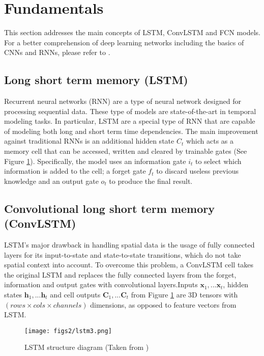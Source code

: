

\section{Fundamentals}

This section addresses the main concepts of LSTM, ConvLSTM and FCN models. For a better comprehension of deep learning networks including the basics of CNNs and RNNs, please refer to \cite{Goodfellow-et-al-2016}.

\subsection{Long short term memory (LSTM)}

Recurrent neural networks (RNN) are a type of neural network designed for processing sequential data. These type of models are state-of-the-art in temporal modeling tasks\cite{ma2017ts}. In particular, LSTM are a special type of RNN that are capable of modeling both long and short term time dependencies. The main improvement against traditional RNNs is an additional hidden state $C_t$ which acts as a memory cell that can be accessed, written and cleared by trainable gates (See Figure \ref{fig:lstm}).  Specifically, the model uses an information gate $i_t$ to select which information is added to the cell; a forget gate $f_t$ to discard useless previous knowledge and an output gate $o_t$ to produce the final result. 

\subsection{Convolutional long short term memory (ConvLSTM)}

LSTM's major drawback in handling spatial data is the usage of fully connected layers for its input-to-state and state-to-state transitions, which do not take spatial context into account. To overcome this problem, a ConvLSTM cell takes the original LSTM and replaces the fully connected layers from the forget, information and output gates with convolutional layers.Inputs $\textbf{x}_1,...\textbf{x}_t$, hidden states $\textbf{h}_1,...\textbf{h}_t$ and cell outputs $\textbf{C}_1,...\textbf{C}_t$ from Figure \ref{fig:lstm} are 3D tensors with $(rows\times cols\times channels)$ dimensions, as opposed to feature vectors from LSTM\cite{xingjian2015convolutional}.


\begin{figure}[t!]
\centering
\texttt{[image: figs2/lstm3.png]}
\caption{LSTM structure diagram (Taken from \cite{rnnjose})}
\label{fig:lstm}
\end{figure}

